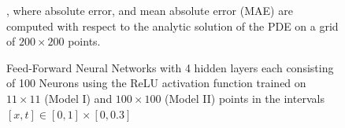 \documentclass[reprint, english, nofootinbib]{revtex4-2}
\begin{document}
\begin{figure}[h!tb]
{    }
    \caption{\label{fig:ReLU composite figure}Feed-Forward Neural Networks with 4 hidden layers each consisting of 100 Neurons using the ReLU activation function trained on $11\times11$ (Model I) and $100\times100$ (Model II) points in the intervals $[x,t]\in[0,1]\times[0,0.3]$}, where absolute error, and mean absolute error (MAE) are computed with respect to the analytic solution of the PDE on a grid of $200\times200$ points.
\end{figure}
\end{document}
